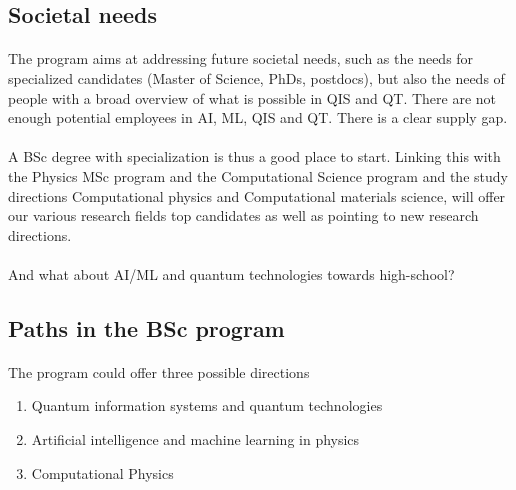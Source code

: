 \documentclass[%
oneside,                 %
final,                   %
10pt]{article}
\begin{document}
\noindent



\subsection*{Societal needs}


\paragraph{}
The program aims at addressing future societal needs, such as the  needs for specialized candidates (Master of Science, PhDs, postdocs), but also the needs of  people with a broad overview of what is possible in  QIS and QT. There are  not enough potential employees in AI, ML, QIS and QT. There is  a clear supply gap.




\paragraph{}
A BSc degree  with specialization  is thus a good place to start. Linking this with the Physics MSc  program and the Computational Science program and the study directions Computational physics and Computational materials science, will offer our various research fields top candidates as well as pointing to new research directions.




\paragraph{}
And what about AI/ML and quantum technologies towards high-school?



\subsection*{Paths in the BSc program}


\paragraph{}
The program could offer  three possible directions
\begin{enumerate}
\item Quantum information systems and quantum technologies

\item Artificial intelligence and machine learning in physics

\item Computational Physics
\end{enumerate}
\end{document}
